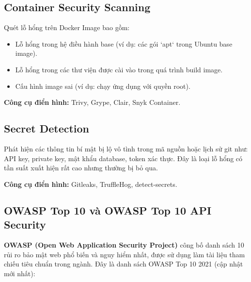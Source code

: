 \documentclass[12pt,a4paper]{report}
\begin{document}
\subsection{Container Security Scanning}

Quét lỗ hổng trên Docker Image bao gồm:
\begin{itemize}[leftmargin=2cm]
    \item Lỗ hổng trong hệ điều hành base (ví dụ: các gói `apt` trong Ubuntu base image).
    \item Lỗ hổng trong các thư viện được cài vào trong quá trình build image.
    \item Cấu hình image sai (ví dụ: chạy ứng dụng với quyền root).
\end{itemize}

\textbf{Công cụ điển hình:} Trivy, Grype, Clair, Snyk Container.

\subsection{Secret Detection}

Phát hiện các thông tin bí mật bị lộ vô tình trong mã nguồn hoặc lịch sử git như: API key, private key, mật khẩu database, token xác thực. Đây là loại lỗ hổng có tần suất xuất hiện rất cao nhưng thường bị bỏ qua.

\textbf{Công cụ điển hình:} Gitleaks, TruffleHog, detect-secrets.

\subsection{OWASP Top 10 và OWASP Top 10 API Security}

\textbf{OWASP (Open Web Application Security Project)} công bố danh sách 10 rủi ro bảo mật web phổ biến và nguy hiểm nhất, được sử dụng làm tài liệu tham chiếu tiêu chuẩn trong ngành. Đây là danh sách OWASP Top 10 2021 (cập nhật mới nhất):
\end{document}
